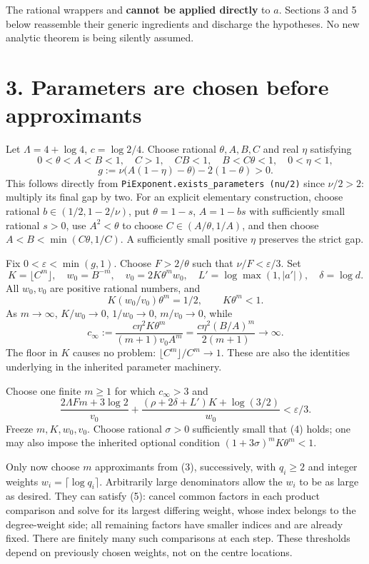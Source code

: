 \documentclass[11pt]{article}
\begin{document}
The rational wrappers 
and  \textbf{cannot
be applied directly} to \(a\). Sections 3 and 5 below reassemble their
generic ingredients and discharge the hypotheses. No new analytic
theorem is being silently assumed.

\section{3. Parameters are chosen before
approximants}\label{parameters-are-chosen-before-approximants}

Let \(\Lambda=4+\log4\), \(c=\log2/4\). Choose rational \(\theta,A,B,C\)
and real \(\eta\) satisfying \[
0<\theta<A<B<1,\quad C>1,\quad CB<1,\quad B<C\theta<1,
\quad0<\eta<1,
\] \[
g:=\nu\bigl(A(1-\eta)-\theta\bigr)-2(1-\theta)>0.     \tag{6}
\] This follows directly from
\texttt{PiExponent.exists\_parameters (nu/2)} since \(\nu/2>2\):
multiply its final gap by two. For an explicit elementary construction,
choose rational \(b\in(1/2,1-2/\nu)\), put \(\theta=1-s\), \(A=1-bs\)
with sufficiently small rational \(s>0\), use \(A^2<\theta\) to choose
\(C\in(A/\theta,1/A)\), and then choose \(A<B<\min(C\theta,1/C)\). A
sufficiently small positive \(\eta\) preserves the strict gap.

Fix \(0<\varepsilon<\min(g,1)\). Choose \(F>2/\theta\) such that
\(\nu/F<\varepsilon/3\). Set \[
K=\lfloor C^m\rfloor,\quad w_0=B^{-m},\quad
v_0=2K\theta^mw_0,
\quad L'=\log\max(1,|a'|),\quad \delta=\log d.        \tag{7}
\] All \(w_0,v_0\) are positive rational numbers, and \[
K(w_0/v_0)\theta^m=1/2,\qquad K\theta^m<1.
\] As \(m\to\infty\), \(K/w_0\to0\), \(1/w_0\to0\), \(m/v_0\to0\), while
\[
c_\infty:=\frac{c\eta^2K\theta^m}{(m+1)v_0A^m}
=\frac{c\eta^2(B/A)^m}{2(m+1)}\longrightarrow\infty. \tag{8}
\] The floor in \(K\) causes no problem: \(\lfloor C^m\rfloor/C^m\to1\).
These are also the identities underlying 
in the inherited parameter machinery.

Choose one finite \(m\ge1\) for which \(c_\infty>3\) and \[
\frac{2\Lambda Fm+3\log2}{v_0}
+\frac{(\rho+2\delta+L')K+\log(3/2)}{w_0}
<\varepsilon/3.                                    \tag{9}
\] Freeze \(m,K,w_0,v_0\). Choose rational \(\sigma>0\) sufficiently
small that (4) holds; one may also impose the inherited optional
condition \((1+3\sigma)^mK\theta^m<1\).

Only now choose \(m\) approximants from (3), successively, with
\(q_i\ge2\) and integer weights \(w_i=\lceil\log q_i\rceil\).
Arbitrarily large denominators allow the \(w_i\) to be as large as
desired. They can satisfy (5): cancel common factors in each product
comparison and solve for its largest differing weight, whose index
belongs to the degree-weight side; all remaining factors have smaller
indices and are already fixed. There are finitely many such comparisons
at each step. These thresholds depend on previously chosen weights, not
on the centre locations.
\end{document}
